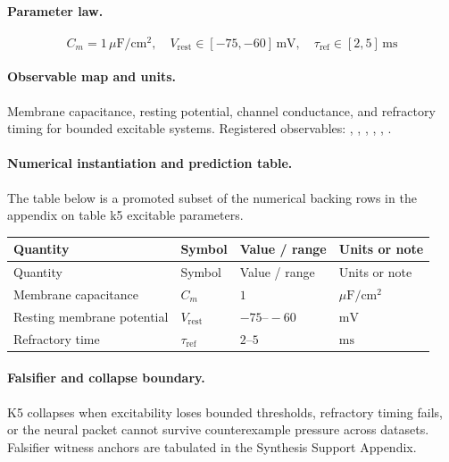 \paragraph{Parameter law.}
\[
C_m = 1\,\mu\mathrm{F/cm^2},\quad V_{\mathrm{rest}} \in [-75,-60]\,\mathrm{mV},\quad \tau_{\mathrm{ref}} \in [2,5]\,\mathrm{ms}
\]

\paragraph{Observable map and units.}
Membrane capacitance, resting potential, channel conductance, and refractory timing for bounded excitable systems.
Registered observables: , \allowbreak {}, \allowbreak {}, \allowbreak {}, \allowbreak {}, \allowbreak {}.

\paragraph{Numerical instantiation and prediction table.}
The table below is a promoted subset of the numerical backing rows in the appendix on table k5 excitable parameters.
\begin{longtable}{@{}L{0.27\textwidth}L{0.15\textwidth}L{0.24\textwidth}L{0.16\textwidth}@{}}
\toprule
Quantity & Symbol & Value / range & Units or note \\
\midrule
\endfirsthead
\toprule
Quantity & Symbol & Value / range & Units or note \\
\midrule
\endhead
Membrane capacitance & $\scriptstyle C_m$ & $1$ & $\mu\mathrm{F/cm^2}$ \\
Resting membrane potential & $\scriptstyle V_{\mathrm{rest}}$ & $-75\text{--}-60$ & $\mathrm{mV}$ \\
Refractory time & $\scriptstyle \tau_{\mathrm{ref}}$ & $2\text{--}5$ & $\mathrm{ms}$ \\
\bottomrule
\end{longtable}

\paragraph{Falsifier and collapse boundary.}
K5 collapses when excitability loses bounded thresholds, refractory timing fails, or the neural packet cannot survive counterexample pressure across datasets.
Falsifier witness anchors are tabulated in the Synthesis Support Appendix.

